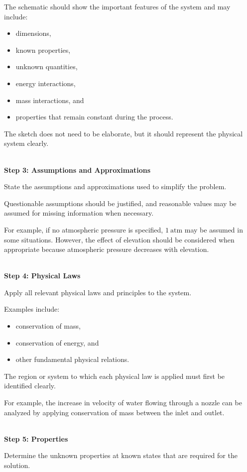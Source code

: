 \documentclass[12pt]{article}
\begin{document}
The schematic should show the important features of the system and may include:
\begin{itemize}
    \item dimensions,
    \item known properties,
    \item unknown quantities,
    \item energy interactions,
    \item mass interactions, and
    \item properties that remain constant during the process.
\end{itemize}

The sketch does not need to be elaborate, but it should represent the physical system clearly.

\textbf{\\ Step 3: Assumptions and Approximations}

State the assumptions and approximations used to simplify the problem.

Questionable assumptions should be justified, and reasonable values may be assumed for missing information when necessary.

For example, if no atmospheric pressure is specified, $1\ \mathrm{atm}$ may be assumed in some situations. However, the effect of elevation should be considered when appropriate because atmospheric pressure decreases with elevation.

\textbf{\\ Step 4: Physical Laws}

Apply all relevant physical laws and principles to the system.

Examples include:
\begin{itemize}
    \item conservation of mass,
    \item conservation of energy, and
    \item other fundamental physical relations.
\end{itemize}

The region or system to which each physical law is applied must first be identified clearly.

For example, the increase in velocity of water flowing through a nozzle can be analyzed by applying conservation of mass between the inlet and outlet.

\textbf{\\ Step 5: Properties}

Determine the unknown properties at known states that are required for the solution.
\end{document}
